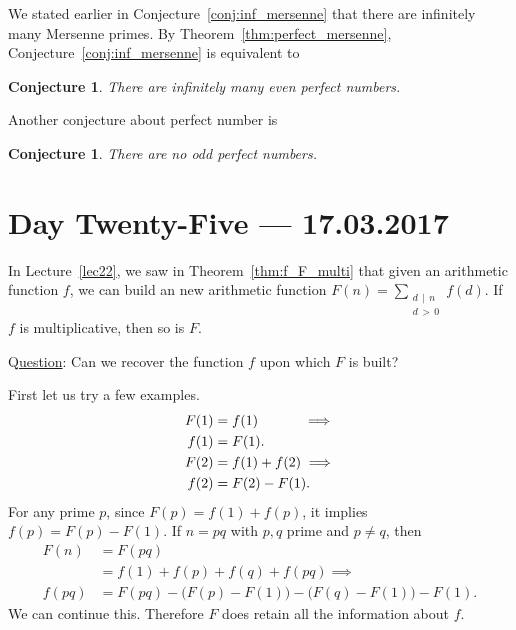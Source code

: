 \documentclass{amsbook}
\theoremstyle{plain}
\newtheorem{conjecture}[theorem]{Conjecture}
\theoremstyle{definition}
\theoremstyle{remark}
\numberwithin{equation}{chapter}
\numberwithin{figure}{chapter}
\begin{document}
We stated earlier in Conjecture~\ref{conj:inf_mersenne} that there are infinitely many Mersenne primes. By Theorem~\ref{thm:perfect_mersenne}, Conjecture~\ref{conj:inf_mersenne} is equivalent to
\begin{conjecture}
  There are infinitely many even perfect numbers. 
\end{conjecture}
Another conjecture about perfect number is 
\begin{conjecture}
  There are no odd perfect numbers.
\end{conjecture}

\chapter[Lecture Twenty-Five]{Day Twenty-Five \hfill {\footnotesize \rm --- 17.03.2017}}

In Lecture~\ref{lec22}, we saw in Theorem~\ref{thm:f_F_multi} that given an arithmetic function $f$, we can build an new arithmetic function $F(n) = \sum_{\substack{d \, \mid \, n \\ d \, > \, 0}} f(d)$. If $f$ is multiplicative, then so is $F$. 

Q\underline{uestion}: Can we recover the function $f$ upon which $F$ is built?

First let us try a few examples.
\begin{align}
  F(1) &= f(1) \hspace{10.7mm}\implies \\
  f(1) &= F(1). \\
  F(2) &= f(1) + f(2) \implies \\
  f(2) &= F(2) - F(1).
\end{align}
For any prime $p$, since $F(p) = f(1) + f(p)$, it implies $f(p) = F(p) - F(1)$. If $n = pq$ with $p, q$ prime and $p \neq q$, then
\begin{align}
  F(n) &= F(pq) \\
       &= f(1) + f(p) + f(q) + f(pq) \implies \\
  f(pq)&= F(pq) - \big(F(p)-F(1)\big) - \big(F(q)-F(1)\big) - F(1).
\end{align}
We can continue this. Therefore $F$ does retain all the information about $f$.
\end{document}
